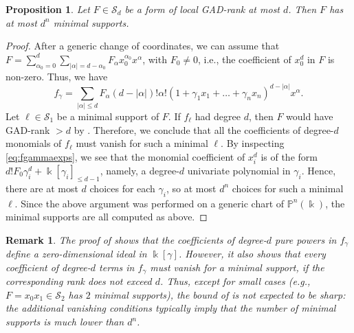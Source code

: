 \documentclass{amsart}
\theoremstyle{plain}
\newtheorem{proposition}[proposition]{Proposition}
\newtheorem{remark}[remark]{Remark}
\renewcommand{\k}{\Bbbk}
\renewcommand{\S}{\mathcal{S}}
\renewcommand{\P}{\mathbb{P}}
\def\a{\alpha}
\def\c{\gamma}
\def\P{{\mathbb{P}}}
\def\GL{\mathrm{GL}}
\numberwithin{equation}{section}
\begin{document}
\begin{proposition} \label{prop:FinitelyManyMinimalSupports}
    Let $F \in \S_d$ be a form of local GAD-rank at most $d$.
    Then $F$ has at most $d^n$ minimal supports.
\end{proposition}
\begin{proof}
    After a generic change of coordinates, we can assume that $F = \sum_{\a_0 = 0}^d \sum_{|\a|=d-\a_0} F_{\a} x_0^{\a_0} x^{\a}$, with $F_{0} \neq 0$, i.e., the coefficient of $x_0^{d}$ in $F$ is non-zero.
    Thus, we have
    \begin{equation} \label{eq:fgammaexps}
        f_{\c} = \sum_{|\a| \leq d} F_{\a} (d-|\a|)! \a! (1+\c_1x_1+\dots+ \c_nx_n)^{d-|\a|} x^{\a}.
    \end{equation}
    Let $\ell \in \S_1$ be a minimal support of $F$.
    If $f_{\ell}$ had degree $d$, then $F$ would have GAD-rank $> d$ by . %
    Therefore, we conclude that all the coefficients of degree-$d$ monomials of $f_{\ell}$ must vanish for such a minimal $\ell$.
    By inspecting \cref{eq:fgammaexps}, we see that the monomial coefficient of $x_i^d$ is of the form $d!F_{0}\c_i^d + \k[\c_i]_{\leq d-1}$, namely, a degree-$d$ univariate polynomial in $\c_i$.
    Hence, there are at most $d$ choices for each $\c_i$, so at most $d^n$ choices for such a minimal $\ell$.
    Since the above argument was performed on a generic chart of $\P^n(\k)$, the minimal supports are all computed as above.
\end{proof}

\begin{remark}
    The proof of  shows that the coefficients of degree-$d$ pure powers in $f_{\c}$ define a zero-dimensional ideal in $\k[\c]$.
    However, it also shows that \emph{every} coefficient of degree-$d$ terms in $f_{\c}$ must vanish for a minimal support, if the corresponding rank does not exceed $d$.
    Thus, except for small cases (e.g., $F = x_0x_1 \in \S_2$ has $2$ minimal supports), the bound of  is not expected to be sharp: the additional vanishing conditions typically imply that the number of minimal supports is much lower than $d^n$.
\end{remark}
\end{document}
